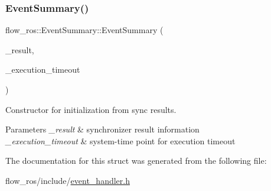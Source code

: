 \subsubsection{\texorpdfstring{Event\+Summary()}{EventSummary()}}
{\footnotesize\ttfamily flow\+\_\+ros\+::\+Event\+Summary\+::\+Event\+Summary (\begin{DoxyParamCaption}\item[{const flow\+::\+Result$<$ ros\+::\+Time $>$ \&}]{\+\_\+result,  }\item[{const std\+::chrono\+::steady\+\_\+clock\+::time\+\_\+point}]{\+\_\+execution\+\_\+timeout }\end{DoxyParamCaption})\hspace{0.3cm}{\ttfamily [inline]}}



Constructor for initialization from sync results. 


\begin{DoxyParams}{Parameters}
{\em \+\_\+result} & synchronizer result information \\
\hline
{\em \+\_\+execution\+\_\+timeout} & system-\/time point for execution timeout \\
\hline
\end{DoxyParams}


The documentation for this struct was generated from the following file\+:\begin{DoxyCompactItemize}
\item 
flow\+\_\+ros/include/\hyperlink{event__handler_8h}{event\+\_\+handler.\+h}\end{DoxyCompactItemize}
